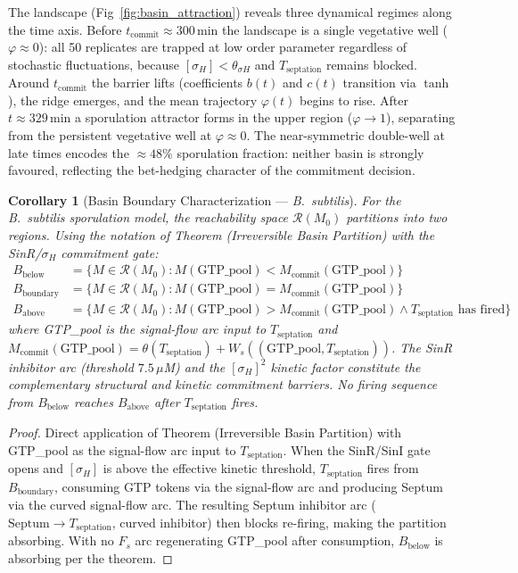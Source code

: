 \documentclass[10pt,letterpaper]{article}
\newtheorem{corollary}[theorem]{Corollary}
\begin{document}
The landscape (Fig~\ref{fig:basin_attraction}) reveals three dynamical regimes along the time axis. Before $t_{\mathrm{commit}} \approx 300\,\mathrm{min}$ the landscape is a single vegetative well ($\varphi \approx 0$): all 50 replicates are trapped at low order parameter regardless of stochastic fluctuations, because $[\sigma_H] < \theta_{\sigma H}$ and $T_{\mathrm{septation}}$ remains blocked. Around $t_{\mathrm{commit}}$ the barrier lifts (coefficients $b(t)$ and $c(t)$ transition via $\tanh$), the ridge emerges, and the mean trajectory $\varphi(t)$ begins to rise. After $t \approx 329\,\mathrm{min}$ a sporulation attractor forms in the upper region ($\varphi \to 1$), separating from the persistent vegetative well at $\varphi \approx 0$. The near-symmetric double-well at late times encodes the ${\approx}48\%$ sporulation fraction: neither basin is strongly favoured, reflecting the bet-hedging character of the commitment decision.

\begin{corollary}[Basin Boundary Characterization --- \textit{B.~subtilis}]
For the \textit{B.~subtilis} sporulation model, the reachability space $\mathcal{R}(M_0)$ partitions into two regions. Using the notation of Theorem (Irreversible Basin Partition) with the SinR/$\sigma_H$ commitment gate:
\begin{align*}
B_{\text{below}} &= \{M \in \mathcal{R}(M_0) : M(\text{GTP\_pool}) < M_{\text{commit}}(\text{GTP\_pool})\} \\
B_{\text{boundary}} &= \{M \in \mathcal{R}(M_0) : M(\text{GTP\_pool}) = M_{\text{commit}}(\text{GTP\_pool})\} \\
B_{\text{above}} &= \{M \in \mathcal{R}(M_0) : M(\text{GTP\_pool}) > M_{\text{commit}}(\text{GTP\_pool}) \wedge T_{\text{septation}}\text{ has fired}\}
\end{align*}
where GTP\_pool is the signal-flow arc input to $T_{\text{septation}}$ and $M_{\text{commit}}(\text{GTP\_pool}) = \theta(T_{\text{septation}}) + W_s((\text{GTP\_pool}, T_{\text{septation}}))$.
The SinR inhibitor arc (threshold $7.5\,\mu$M) and the $[\sigma_H]^2$ kinetic factor constitute the complementary structural and kinetic commitment barriers. No firing sequence from $B_{\text{below}}$ reaches $B_{\text{above}}$ after $T_{\text{septation}}$ fires.
\end{corollary}

\begin{proof}
Direct application of Theorem (Irreversible Basin Partition) with GTP\_pool as the signal-flow arc input to $T_{\text{septation}}$.
When the SinR/SinI gate opens and $[\sigma_H]$ is above the effective kinetic threshold, $T_{\text{septation}}$ fires from $B_{\text{boundary}}$, consuming GTP tokens via the signal-flow arc and producing Septum via the curved signal-flow arc. The resulting Septum inhibitor arc ($\text{Septum} \to T_{\text{septation}}$, curved inhibitor) then blocks re-firing, making the partition absorbing. With no $F_s$ arc regenerating GTP\_pool after consumption, $B_{\text{below}}$ is absorbing per the theorem.
\end{proof}
\end{document}
